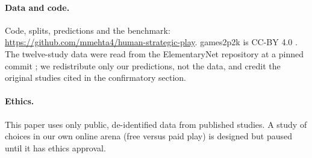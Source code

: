 \documentclass[11pt]{article}
\begin{document}
\paragraph{Data and code.} Code, splits, predictions and the benchmark: \url{https://github.com/mmehta4/human-strategic-play}. games2p2k is
CC-BY 4.0 \citep{zhu2025capturing}. The twelve-study data were read from the ElementaryNet repository
at a pinned commit \citep{deon2026elementarynet}; we redistribute only our predictions, not the data,
and credit the original studies cited in the confirmatory section.

\paragraph{Ethics.} This paper uses only public, de-identified data from published studies. A study of
choices in our own online arena (free versus paid play) is designed but paused until it has ethics
approval.



\end{document}
